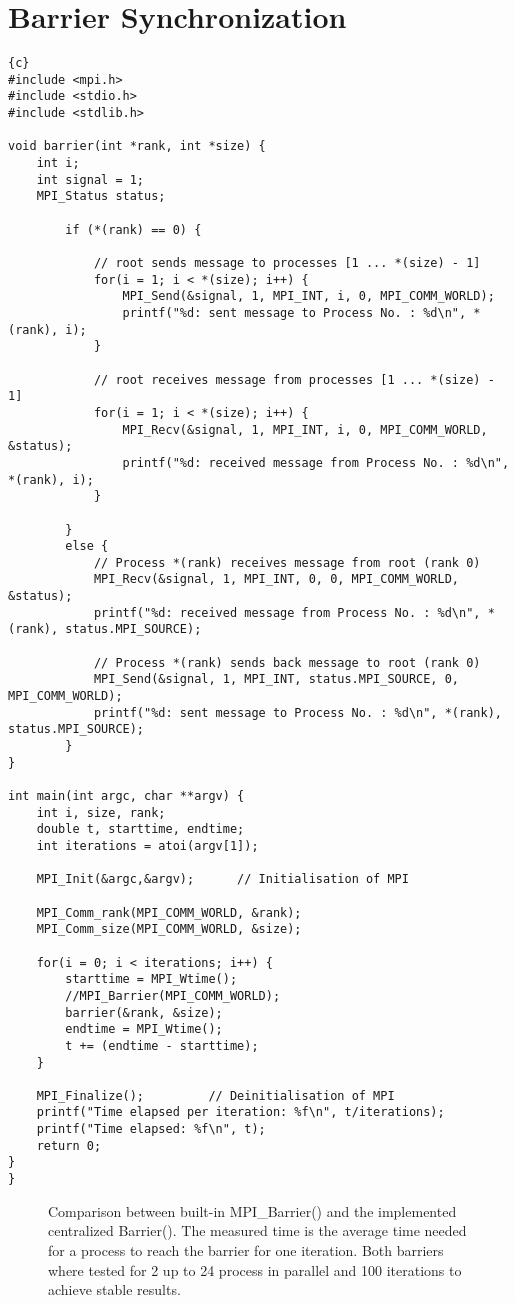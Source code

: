 \documentclass{article}
\newcommand{\enterProblemHeader}[1]{
}
\newcommand{\exitProblemHeader}[1]{
}
\newcounter{homeworkProblemCounter} %
\newcommand{\homeworkProblemName}{}
\newenvironment{homeworkProblem}[1][Problem \arabic{homeworkProblemCounter}]{ %
\stepcounter{homeworkProblemCounter} %
\renewcommand{\homeworkProblemName}{#1} %
\section{\homeworkProblemName} %
}{
}
\begin{document}
\begin{homeworkProblem}[Barrier Synchronization]

\begin{lstlisting}{c}
#include <mpi.h>
#include <stdio.h>
#include <stdlib.h>

void barrier(int *rank, int *size) {
	int i;
	int signal = 1;
	MPI_Status status;

		if (*(rank) == 0) {

			// root sends message to processes [1 ... *(size) - 1]
			for(i = 1; i < *(size); i++) {
				MPI_Send(&signal, 1, MPI_INT, i, 0, MPI_COMM_WORLD);
				printf("%d: sent message to Process No. : %d\n", *(rank), i);
			}
			
			// root receives message from processes [1 ... *(size) - 1]
			for(i = 1; i < *(size); i++) {
				MPI_Recv(&signal, 1, MPI_INT, i, 0, MPI_COMM_WORLD, &status);
				printf("%d: received message from Process No. : %d\n", *(rank), i);
			}
		
		} 
		else {
			// Process *(rank) receives message from root (rank 0)
			MPI_Recv(&signal, 1, MPI_INT, 0, 0, MPI_COMM_WORLD, &status);
			printf("%d: received message from Process No. : %d\n", *(rank), status.MPI_SOURCE);			

			// Process *(rank) sends back message to root (rank 0)
			MPI_Send(&signal, 1, MPI_INT, status.MPI_SOURCE, 0, MPI_COMM_WORLD);
			printf("%d: sent message to Process No. : %d\n", *(rank), status.MPI_SOURCE);			
		}
}

int main(int argc, char **argv) {
	int i, size, rank;
	double t, starttime, endtime;
	int iterations = atoi(argv[1]);

	MPI_Init(&argc,&argv);		// Initialisation of MPI
	
	MPI_Comm_rank(MPI_COMM_WORLD, &rank);
	MPI_Comm_size(MPI_COMM_WORLD, &size);
	
	for(i = 0; i < iterations; i++) {
		starttime = MPI_Wtime();
		//MPI_Barrier(MPI_COMM_WORLD);		
		barrier(&rank, &size);
		endtime = MPI_Wtime();
		t += (endtime - starttime);
	}

	MPI_Finalize();			// Deinitialisation of MPI
	printf("Time elapsed per iteration: %f\n", t/iterations);
	printf("Time elapsed: %f\n", t);
	return 0;
}
}\end{lstlisting}

\begin{figure}
    \begin{center}
        
    \end{center}
    \caption{Comparison between built-in MPI_Barrier() and the implemented centralized Barrier(). The measured time is the average time needed for a process to reach the barrier for one iteration. Both barriers where tested for 2 up to 24 process in parallel and 100 iterations to achieve stable results.}
\end{figure}    

\end{homeworkProblem}
\end{document}
